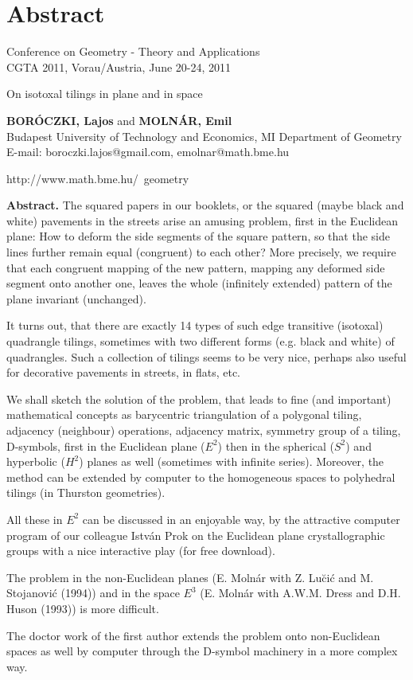 \section{Abstract}
\begin{frame}
  \tiny
Conference on Geometry - Theory and Applications\\
CGTA 2011, Vorau/Austria, June 20-24, 2011
\vfill
\normalsize
\begin{center} On isotoxal tilings in plane and in space\end{center}

\vfill
\tiny
\textbf{BORÓCZKI, Lajos} and \textbf{MOLNÁR, Emil}\\
Budapest University of Technology and Economics, MI Department of Geometry\\
E-mail: boroczki.lajos@gmail.com, emolnar@math.bme.hu\\
\vfill

http://www.math.bme.hu/~geometry
\vfill

\tiny
\textbf{Abstract.} The squared papers in our booklets, or the squared (maybe black and white)
pavements in the streets arise an amusing problem, first in the Euclidean plane:
How to deform the side segments of the square pattern, so that the side lines
further remain equal (congruent) to each other? More precisely, we require that
each congruent mapping of the new pattern, mapping any deformed side segment
onto another one, leaves the whole (infinitely extended) pattern of the plane
invariant (unchanged).
\vfill

It turns out, that there are exactly 14 types of such  edge  transitive
(isotoxal) quadrangle tilings, sometimes  with  two  different  forms  (e.g.
black and white) of quadrangles. Such a collection of tilings seems  to  be
very nice, perhaps also useful  for  decorative  pavements  in  streets, in flats, etc.
\vfill

We shall sketch the solution of the problem, that leads to  fine  (and
important)  mathematical  concepts  as  barycentric   triangulation   of   a
polygonal  tiling,  adjacency  (neighbour)  operations,  adjacency   matrix,
symmetry group of a tiling, D-symbols, first in  the  Euclidean  plane  ($E^2$)
then in the spherical ($S^2$) and hyperbolic ($H^2$)  planes  as  well  (sometimes
with infinite series). Moreover, the method can be extended by  computer  to
the homogeneous spaces to polyhedral tilings (in Thurston geometries).
\vfill

All these  in  $E^2$  can  be  discussed  in  an  enjoyable  way,  by  the
attractive computer program of our colleague István Prok  on  the  Euclidean
plane crystallographic  groups  with  a  nice  interactive  play  (for  free
download).
\vfill

The problem in the non-Euclidean planes (E. Molnár with  Z.  Lu\u{c}i\'{c}  and
M. Stojanovi\'{c} (1994)) and in the space $E^3$ (E. Molnár with A.W.M.  Dress  and
D.H. Huson (1993)) is more difficult.
\vfill

The doctor work of the first author extends the problem onto non-Euclidean
spaces as well by computer through the D-symbol machinery in a more complex
way.
\vfill

\end{frame}

